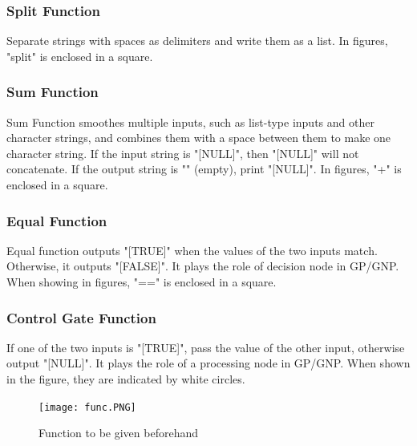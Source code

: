 \documentclass{article}
\begin{document}
\subsubsection{Split Function}
Separate strings with spaces as delimiters and write them as a list.
In figures, "split" is enclosed in a square.

\subsubsection{Sum Function}
Sum Function smoothes multiple inputs, such as list-type inputs and other character strings, and combines them with a space between them to make one character string.
If the input string is "[NULL]", then "[NULL]" will not concatenate.
If the output string is "" (empty), print "[NULL]".
In figures, "+" is enclosed in a square.




\subsubsection {Equal Function}
Equal function outputs "[TRUE]" when the values of the two inputs match.
Otherwise, it outputs "[FALSE]".
It plays the role of decision node in GP/GNP.
When showing in figures, "==" is enclosed in a square.



\subsubsection {Control Gate Function}
If one of the two inputs is "[TRUE]", pass the value of the other input, otherwise output "[NULL]".
It plays the role of a processing node in GP/GNP.
When shown in the figure, they are indicated by white circles.



\begin{figure}[t]
\begin{center}
\texttt{[image: func.PNG]}
\end{center}
\caption {Function to be given beforehand}
\label{fig:func}
\end{figure}
\end{document}
